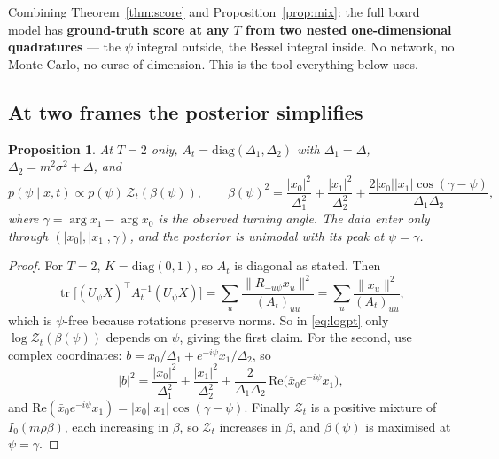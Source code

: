 \documentclass[11pt]{article}
\theoremstyle{plain}
\newtheorem{proposition}{Proposition}
\theoremstyle{remark}
\newcommand{\Z}{\mathcal{Z}}
\newcommand{\T}{^{\!\top}}
\DeclareMathOperator{\tr}{tr}
\begin{document}
Combining Theorem~\ref{thm:score} and Proposition~\ref{prop:mix}: the full board
model has \textbf{ground-truth score at any $T$ from two nested
one-dimensional quadratures} --- the $\psi$ integral outside, the Bessel
integral inside. No network, no Monte Carlo, no curse of dimension. This is the
tool everything below uses.

\subsection{At two frames the posterior simplifies}

\begin{proposition}\label{prop:T2}
At $T = 2$ only, $A_t = \mathrm{diag}(\Delta_1, \Delta_2)$ with
$\Delta_1 = \Delta$, $\Delta_2 = m^2\sigma^2 + \Delta$, and
\begin{equation}
  p(\psi\mid x, t) \propto p(\psi)\, \Z_t(\beta(\psi)),
  \qquad
  \beta(\psi)^2 = \frac{|x_0|^2}{\Delta_1^2} + \frac{|x_1|^2}{\Delta_2^2}
  + \frac{2 |x_0| |x_1| \cos(\gamma - \psi)}{\Delta_1\Delta_2},
  \label{eq:betapsi}
\end{equation}
where $\gamma = \arg x_1 - \arg x_0$ is the observed turning angle. The data
enter only through $(|x_0|, |x_1|, \gamma)$, and the posterior is unimodal with
its peak at $\psi = \gamma$.
\end{proposition}

\begin{proof}
For $T = 2$, $K = \mathrm{diag}(0,1)$, so $A_t$ is diagonal as stated. Then
\begin{equation}
  \tr\bigl[(U_\psi X)\T A_t^{-1}(U_\psi X)\bigr]
  = \sum_u \frac{\|R_{-u\psi}x_u\|^2}{(A_t)_{uu}}
  = \sum_u \frac{\|x_u\|^2}{(A_t)_{uu}},
\end{equation}
which is $\psi$-free because rotations preserve norms. So in \eqref{eq:logpt}
only $\log\Z_t(\beta(\psi))$ depends on $\psi$, giving the first claim. For the
second, use complex coordinates: $b = x_0/\Delta_1 + e^{-i\psi}x_1/\Delta_2$, so
\begin{equation}
  |b|^2 = \frac{|x_0|^2}{\Delta_1^2} + \frac{|x_1|^2}{\Delta_2^2}
  + \frac{2}{\Delta_1\Delta_2}\,\mathrm{Re}\bigl(\bar x_0 e^{-i\psi} x_1\bigr),
\end{equation}
and $\mathrm{Re}(\bar x_0 e^{-i\psi}x_1) = |x_0||x_1|\cos(\gamma - \psi)$.
Finally $\Z_t$ is a positive mixture of $I_0(m\rho\beta)$, each increasing in
$\beta$, so $\Z_t$ increases in $\beta$, and $\beta(\psi)$ is maximised at
$\psi = \gamma$.
\end{proof}
\end{document}
